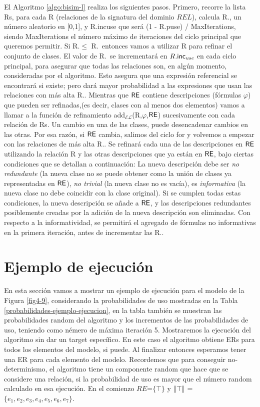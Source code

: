 El Algoritmo \ref{algo:bisim-l} realiza los siguientes pasos. Primero, recorre la lista Rs, para cada R (relaciones de la signatura del dominio $REL$), calcula R.\randomuse, un n\'umero aleatorio en [0,1], y R.incuse que ser\'a (1 - R.puse) / MaxIterations, siendo MaxIterations el n\'umero m\'aximo de iteraciones del ciclo principal que queremos permitir. Si R.\randomuse $\le$ R.\puse\ entonces vamos a utilizar R para refinar el conjunto de
clases. El valor de R.\puse\ se incrementar\'a en $R.\textsf{inc}_\emph{use}$
en cada ciclo principal, para asegurar que todas las relaciones son, en alg\'un momento,
consideradas por el algoritmo. Esto asegura que una expresi\'on referencial
se encontrar\'a si existe; pero dar\'a mayor probabilidad a las expresiones
que usan las relaciones con m\'as alta R.\puse. Mientras que $\textsf{RE}$ contiene descripciones (f\'ormulas $\varphi$) que pueden ser refinadas,(es decir, clases
con al menos dos elementos) vamos a llamar a la funci\'on de refinamiento
add$_\mathcal{EL}$(R,$\varphi$,$\textsf{RE}$) sucesivamente con cada relaci\'on
de Rs. Un cambio en una de las clases, puede desencadenar cambios en
las otras. Por esa raz\'on, si $\textsf{RE}$ cambia, salimos del ciclo for y volvemos a
empezar con las relaciones de m\'as alta R.\puse. Se refinar\'a cada una de las descripciones
en $\textsf{RE}$ utilizando la relaci\'on R y las otras descripciones que ya est\'an en
$\textsf{RE}$, bajo ciertas condiciones que se detallan a continuaci\'on: 
La nueva descripci\'on debe ser
\emph{no redundante} (la nueva clase no se puede obtener como la uni\'on de
clases ya representadas en $\textsf{RE}$), \emph{no trivial} (la nueva
clase no es vac\'{i}a), es \emph{informativa} (la nueva clase no debe
coincidir con la clase original). Si se cumplen todas estas condiciones,
la nueva descripci\'on se a\~nade a $\textsf{RE}$, y las descripciones redundantes
posiblemente creadas por la adici\'on de la nueva descripci\'on son
eliminadas.
Con respecto a la informatividad, se permitir\'a el agregado de f\'ormulas no informativas en la primera iteraci\'on, antes de incrementar las R.\puse.

\section{Ejemplo de ejecuci\'on}
\label{sec:ejemplo_ejecucion}

En esta secci\'on vamos a mostrar un ejemplo de ejecuci\'on para el modelo de la Figura \ref{fig4-9}, considerando la probabilidades de uso mostradas en la Tabla \ref{probabilidades-ejemplo-ejecucion}, en la tabla tambi\'en se muestran las probabilidades random del algoritmo y los incrementos de las probabilidades de uso, teniendo como n\'emero de m\'axima iteraci\'on 5. Mostraremos la ejecuci\'on del algoritmo sin dar un target espec\'ifico. En este caso el algoritmo obtiene ERs para todos los elementos del modelo, si puede. Al finalizar entonces esperamos tener una ER para cada elemento del modelo. Recordemos que para conseguir no-determinismo, el algoritmo tiene un componente random que hace que se considere una relaci\'on, si la probabilidad de uso es mayor que el n\'umero random calculado en esa ejecuci\'on. 
En el comienzo $RE$=$\{\top\}$ y $|\!|\top|\!|$ = $\{e_1, e_2, e_3, e_4, e_5, e_6, e_7\}$.\\

